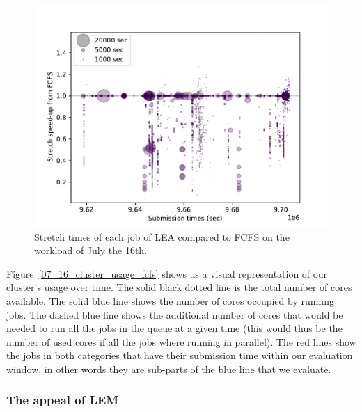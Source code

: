 \documentclass[conference,10pt]{IEEEtran}
\begin{document}
\begin{figure}[H]\centering\includegraphics[scale=0.47]{../MBSS/plot/Stretch_times/Stretch_times_FCFS_SCORE_2022-07-16->2022-07-16_V10000_450_128_32_256_4_1024.pdf}\caption{Stretch times of each job of LEA compared to FCFS on the workload of July the 16th.}\end{figure}

Figure~\ref{07_16_cluster_usage_fcfs} shows us a visual representation of 
our cluster's usage over time. The solid black dotted line is the total
number of cores available.
The solid blue line shows the number of cores occupied by running jobs.
The dashed blue line shows the additional number of cores that would be needed
to run all the jobs in the queue at a given time (this would thus be the number
of used cores if all the jobs where running in parallel).
The red lines show the jobs in both categories that have their submission
time within our evaluation window, in other words they are sub-parts of the blue line
that we evaluate.


\subsubsection{The appeal of LEM}
\end{document}

